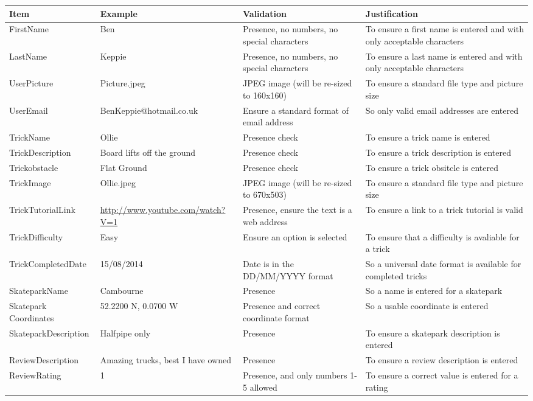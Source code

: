 \begin{center}
\begin{tabular}{|p{3cm}|p{3cm}|p{3cm}|p{3cm}|}
\hline \textbf{Item} & \textbf{Example} & \textbf{Validation} & \textbf{Justification} \\ \hline
FirstName & Ben & Presence, no numbers, no special characters & To ensure a first name is entered and with only acceptable characters \\ \hline
LastName & Keppie & Presence, no numbers, no special characters & To ensure a last name is entered and with only acceptable characters \\ \hline
UserPicture & Picture.jpeg & JPEG image (will be re-sized to 160x160) & To ensure a standard file type and picture size \\ \hline 
UserEmail & BenKeppie@hotmail.co.uk & Ensure a standard format of email address & So only valid email addresses are entered \\ \hline
TrickName & Ollie & Presence check & To ensure a trick name is entered \\ \hline
TrickDescription & Board lifts off the ground & Presence check & To ensure a trick description is entered \\ \hline
Trickobstacle & Flat Ground & Presence check & To ensure a trick obsitcle is entered \\ \hline
TrickImage & Ollie.jpeg & JPEG image (will be re-sized to 670x503) & To ensure a standard file type and picture size \\ \hline
TrickTutorialLink &\url{ http://www.youtube.com/watch?V=1} & Presence, ensure the text is a web address & To ensure a link to a trick tutorial is valid \\ \hline
TrickDifficulty & Easy & Ensure an option is selected & To ensure that a difficulty is avaliable for a trick \\ \hline
TrickCompletedDate & 15/08/2014 & Date is in the DD/MM/YYYY format & So a universal date format is available for completed tricks \\ \hline
SkateparkName & Cambourne & Presence & So a name is entered for a skatepark \\ \hline
Skatepark Coordinates & 52.2200 N, 0.0700 W & Presence and correct coordinate format & So a usable coordinate is entered \\ \hline
SkateparkDescription & Halfpipe only & Presence &  To ensure a skatepark description is entered \\ \hline
ReviewDescription & Amazing trucks, best I have owned & Presence & To ensure a review description is entered \\ \hline
ReviewRating & 1 & Presence, and only numbers 1-5 allowed & To ensure a correct value is entered for a rating \\ \hline

\end{tabular}
\end{center} 


